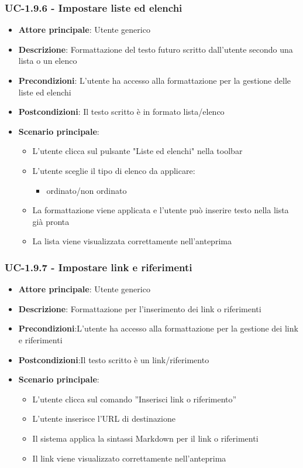 \documentclass[11pt,a4paper]{article}
\begin{document}
\subsubsection{UC-1.9.6 - Impostare liste ed elenchi}
\begin{itemize}
    \item \textbf{Attore principale}: Utente generico
    \item \textbf{Descrizione}: Formattazione del testo futuro scritto dall’utente secondo una lista o un elenco
    \item \textbf{Precondizioni}: L’utente ha accesso alla formattazione per la gestione delle liste ed elenchi
    \item \textbf{Postcondizioni}: Il testo scritto è in formato lista/elenco
    \item \textbf{Scenario principale}:
        \begin{itemize}
            \item L’utente clicca sul pulsante "Liste ed elenchi" nella toolbar
            \item L’utente sceglie il tipo di elenco da applicare:
                \begin{itemize}
                    \item ordinato/non ordinato
                \end{itemize}
            \item La formattazione viene applicata e l'utente può inserire testo nella lista già pronta
            \item La lista viene visualizzata correttamente nell'anteprima
        \end{itemize}
\end{itemize}

\subsubsection{UC-1.9.7 - Impostare link e riferimenti}
\begin{itemize}
    \item \textbf{Attore principale}: Utente generico
    \item \textbf{Descrizione}: Formattazione per l’inserimento dei link o riferimenti
    \item \textbf{Precondizioni}:L’utente ha accesso alla formattazione per la gestione dei link e riferimenti
    \item \textbf{Postcondizioni}:Il testo scritto è un link/riferimento
    \item \textbf{Scenario principale}:
        \begin{itemize}
            \item L’utente clicca sul comando ”Inserisci link o riferimento”
            \item L’utente inserisce l’URL di destinazione
            \item Il sistema applica la sintassi Markdown per il link o riferimenti
            \item Il link viene visualizzato correttamente nell'anteprima
        \end{itemize}
\end{itemize}
\end{document}
